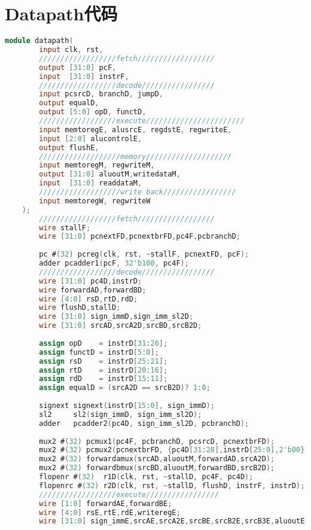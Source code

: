 \appendix
\section{Datapath代码}
\begin{lstlisting}[language=Verilog]
    module datapath(
        input clk, rst,
        //////////////////fetch//////////////////
        output [31:0] pcF,
        input  [31:0] instrF,
        //////////////////decode/////////////////
        input pcsrcD, branchD, jumpD,
        output equalD,
        output [5:0] opD, functD,
        //////////////////execute///////////////////////
        input memtoregE, alusrcE, regdstE, regwriteE,
        input [2:0] alucontrolE,
        output flushE,
        ///////////////////memory////////////////////
        input memtoregM, regwriteM,
        output [31:0] aluoutM,writedataM,
        input  [31:0] readdataM,
        ///////////////////write back/////////////////
        input memtoregW, regwriteW
    );
        //////////////////fetch//////////////////
        wire stallF;
        wire [31:0] pcnextFD,pcnextbrFD,pc4F,pcbranchD;
        
        pc #(32) pcreg(clk, rst, ~stallF, pcnextFD, pcF);
        adder pcadder1(pcF, 32'b100, pc4F);
        //////////////////decode/////////////////
        wire [31:0] pc4D,instrD;
        wire forwardAD,forwardBD;
        wire [4:0] rsD,rtD,rdD;
        wire flushD,stallD; 
        wire [31:0] sign_immD,sign_imm_sl2D;
        wire [31:0] srcAD,srcA2D,srcBD,srcB2D;
        
        assign opD    = instrD[31:26];
        assign functD = instrD[5:0];
        assign rsD    = instrD[25:21];
        assign rtD    = instrD[20:16];
        assign rdD    = instrD[15:11];
        assign equalD = (srcA2D == srcB2D)? 1:0;
        
        signext signext(instrD[15:0], sign_immD);
        sl2     sl2(sign_immD, sign_imm_sl2D);
        adder   pcadder2(pc4D, sign_imm_sl2D, pcbranchD);
        
        mux2 #(32) pcmux1(pc4F, pcbranchD, pcsrcD, pcnextbrFD); 
        mux2 #(32) pcmux2(pcnextbrFD, {pc4D[31:28],instrD[25:0],2'b00}, jumpD, pcnextFD);
        mux2 #(32) forwardamux(srcAD,aluoutM,forwardAD,srcA2D);
        mux2 #(32) forwardbmux(srcBD,aluoutM,forwardBD,srcB2D);
        flopenr #(32)  r1D(clk, rst, ~stallD, pc4F, pc4D);
        flopenrc #(32) r2D(clk, rst, ~stallD, flushD, instrF, instrD);
        //////////////////execute/////////////////
        wire [1:0] forwardAE,forwardBE;
        wire [4:0] rsE,rtE,rdE,writeregE;
        wire [31:0] sign_immE,srcAE,srcA2E,srcBE,srcB2E,srcB3E,aluoutE;
        

\end{lstlisting}
